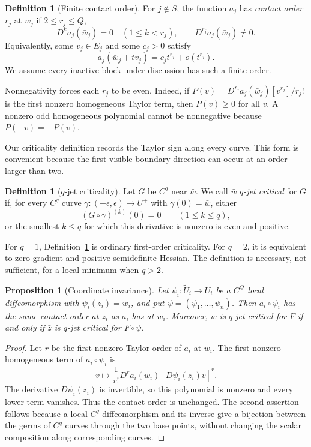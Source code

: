 \documentclass[11pt]{article}
\newtheorem{proposition}[theorem]{Proposition}
\theoremstyle{definition}
\newtheorem{definition}[theorem]{Definition}
\theoremstyle{remark}
\begin{document}
\begin{definition}[Finite contact order]\label{def:contact}
For $j\notin S$, the function $a_j$ has \emph{contact order} $r_j$ at
$\bar w_j$ if $2\le r_j\le Q$,
\[
  D^k a_j(\bar w_j)=0\quad(1\le k<r_j),
  \qquad D^{r_j}a_j(\bar w_j)\ne 0.
\]
Equivalently, some $v_j\in E_j$ and some $c_j>0$ satisfy
\begin{equation}\label{eq:contact-path}
  a_j(\bar w_j+t v_j)=c_jt^{r_j}+o(t^{r_j}).
\end{equation}
We assume every inactive block under discussion has such a finite order.
\end{definition}

Nonnegativity forces each $r_j$ to be even. Indeed, if
$P(v)=D^{r_j}a_j(\bar w_j)[v^{r_j}]/r_j!$ is the first nonzero homogeneous
Taylor term, then $P(v)\ge0$ for all $v$. A nonzero odd homogeneous polynomial
cannot be nonnegative because $P(-v)=-P(v)$.

Our criticality definition records the Taylor sign along every curve. This
form is convenient because the first visible boundary direction can occur at
an order larger than two.

\begin{definition}[$q$-jet criticality]\label{def:jet}
Let $G$ be $C^q$ near $\bar w$. We call $\bar w$ \emph{$q$-jet critical} for
$G$ if, for every $C^q$ curve $\gamma:(-\epsilon,\epsilon)\to U^+$ with
$\gamma(0)=\bar w$, either
\[
  (G\circ\gamma)^{(k)}(0)=0\qquad(1\le k\le q),
\]
or the smallest $k\le q$ for which this derivative is nonzero is even and
positive.
\end{definition}

For $q=1$, Definition~\ref{def:jet} is ordinary first-order criticality. For
$q=2$, it is equivalent to zero gradient and positive-semidefinite Hessian.
The definition is necessary, not sufficient, for a local minimum when
$q>2$.

\begin{proposition}[Coordinate invariance]\label{prop:invariance}
Let $\psi_i:\widetilde U_i\to U_i$ be a $C^Q$ local diffeomorphism with
$\psi_i(\bar z_i)=\bar w_i$, and put $\psi=(\psi_1,\ldots,\psi_n)$. Then
$a_i\circ\psi_i$ has the same contact order at $\bar z_i$ as $a_i$ has at
$\bar w_i$. Moreover, $\bar w$ is $q$-jet critical for $F$ if and only if
$\bar z$ is $q$-jet critical for $F\circ\psi$.
\end{proposition}

\begin{proof}
Let $r$ be the first nonzero Taylor order of $a_i$ at $\bar w_i$. The first
nonzero homogeneous term of $a_i\circ\psi_i$ is
\[
  v\longmapsto
  \frac1{r!}D^r a_i(\bar w_i)
  [D\psi_i(\bar z_i)v]^r.
\]
The derivative $D\psi_i(\bar z_i)$ is invertible, so this polynomial is
nonzero and every lower term vanishes. Thus the contact order is unchanged.
The second assertion follows because a local $C^q$ diffeomorphism and its
inverse give a bijection between the germs of $C^q$ curves through the two
base points, without changing the scalar composition along corresponding
curves.
\end{proof}
\end{document}
